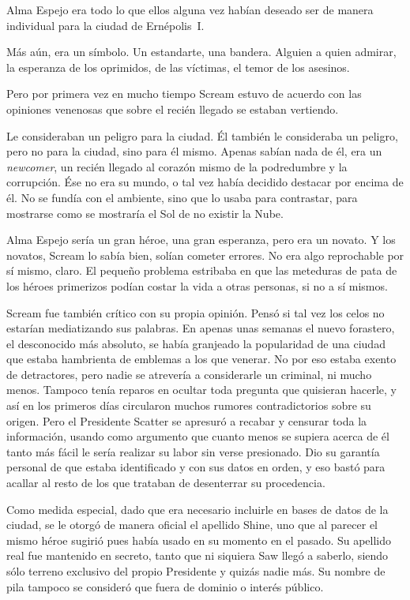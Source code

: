 Alma Espejo era todo lo que ellos alguna vez habían deseado ser de manera individual para la ciudad de Ernépolis~I.

Más aún, era un símbolo. Un estandarte, una bandera. Alguien a quien admirar, la esperanza de los oprimidos, de las víctimas, el temor de los asesinos.

Pero por primera vez en mucho tiempo Scream estuvo de acuerdo con las opiniones venenosas que sobre el recién llegado se estaban vertiendo.

Le consideraban un peligro para la ciudad. Él también le consideraba un peligro, pero no para la ciudad, sino para él mismo. Apenas sabían nada de él, era un \emph{newcomer}, un recién llegado al corazón mismo de la podredumbre y la corrupción. Ése no era su mundo, o tal vez había decidido destacar por encima de él. No se fundía con el ambiente, sino que lo usaba para contrastar, para mostrarse como se mostraría el Sol de no existir la Nube.

Alma Espejo sería un gran héroe, una gran esperanza, pero era un novato. Y los novatos, Scream lo sabía bien, solían cometer errores. No era algo reprochable por sí mismo, claro. El pequeño problema estribaba en que las meteduras de pata de los héroes primerizos podían costar la vida a otras personas, si no a sí mismos.

Scream fue también crítico con su propia opinión. Pensó si tal vez los celos no estarían mediatizando sus palabras. En apenas unas semanas el nuevo forastero, el desconocido más absoluto, se había granjeado la popularidad de una ciudad que estaba hambrienta de emblemas a los que venerar. No por eso estaba exento de detractores, pero nadie se atrevería a considerarle un criminal, ni mucho menos. Tampoco tenía reparos en ocultar toda pregunta que quisieran hacerle, y así en los primeros días circularon muchos rumores contradictorios sobre su origen. Pero el Presidente Scatter se apresuró a recabar y censurar toda la información, usando como argumento que cuanto menos se supiera acerca de él tanto más fácil le sería realizar su labor sin verse presionado. Dio su garantía personal de que estaba identificado y con sus datos en orden, y eso bastó para acallar al resto de los que trataban de desenterrar su procedencia.

Como medida especial, dado que era necesario incluirle en bases de datos de la ciudad, se le otorgó de manera oficial el apellido Shine, uno que al parecer el mismo héroe sugirió pues había usado en su momento en el pasado. Su apellido real fue mantenido en secreto, tanto que ni siquiera Saw llegó a saberlo, siendo sólo terreno exclusivo del propio Presidente y quizás nadie más. Su nombre de pila tampoco se consideró que fuera de dominio o interés público.


